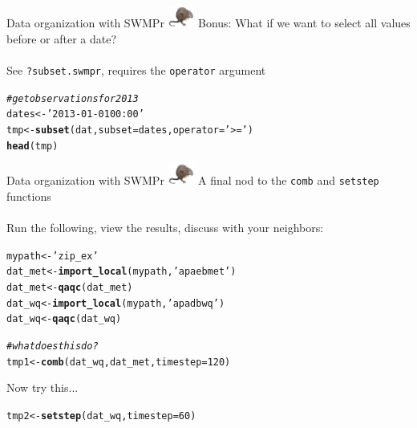 \documentclass[xcolor=dvipsnames]{beamer}\usepackage[]{graphicx}\usepackage[]{color}
\makeatletter
\newcommand{\hlnum}[1]{\textcolor[rgb]{0.686,0.059,0.569}{#1}}%
\newcommand{\hlstr}[1]{\textcolor[rgb]{0.192,0.494,0.8}{#1}}%
\newcommand{\hlcom}[1]{\textcolor[rgb]{0.678,0.584,0.686}{\textit{#1}}}%
\newcommand{\hlstd}[1]{\textcolor[rgb]{0.345,0.345,0.345}{#1}}%
\newcommand{\hlkwb}[1]{\textcolor[rgb]{0.69,0.353,0.396}{#1}}%
\newcommand{\hlkwc}[1]{\textcolor[rgb]{0.333,0.667,0.333}{#1}}%
\newcommand{\hlkwd}[1]{\textcolor[rgb]{0.737,0.353,0.396}{\textbf{#1}}}%
\newenvironment{kframe}{%
 \def\at@end@of@kframe{}%
 \ifinner\ifhmode%
  \def\at@end@of@kframe{\end{minipage}}%
  \begin{minipage}{\columnwidth}%
 \fi\fi%
 \def\FrameCommand##1{\hskip\@totalleftmargin \hskip-\fboxsep
 \colorbox{shadecolor}{##1}\hskip-\fboxsep
     \hskip-\linewidth \hskip-\@totalleftmargin \hskip\columnwidth}%
 \MakeFramed {\advance\hsize-\width
   \@totalleftmargin\z@ \linewidth\hsize
   \@setminipage}}%
 {\par\unskip\endMakeFramed%
 \at@end@of@kframe}
\newenvironment{knitrout}{}{} %
\makeatother
\begin{document}
\begin{frame}[fragile]{Data organization with SWMPr \includegraphics[width = 0.065\textwidth]{imgs/swmprat.png}}
\onslide<+->
Bonus: What if we want to select all values before or after a date?  \\~\\
See \texttt{?subset.swmpr}, requires the \texttt{operator} argument
\onslide<+->
\begin{knitrout}\scriptsize
{}\color{fgcolor}\begin{kframe}
\begin{alltt}
\hlcom{# get observations for 2013}
\hlstd{dates} \hlkwb{<-} \hlstr{'2013-01-01 00:00'}
\hlstd{tmp} \hlkwb{<-} \hlkwd{subset}\hlstd{(dat,} \hlkwc{subset} \hlstd{= dates,} \hlkwc{operator} \hlstd{=} \hlstr{'>='}\hlstd{)}
\hlkwd{head}\hlstd{(tmp)}
\end{alltt}
\end{kframe}
\end{knitrout}
\end{frame}

\begin{frame}[fragile]{Data organization with SWMPr \includegraphics[width = 0.065\textwidth]{imgs/swmprat.png}}
\onslide<+->
A final nod to the \texttt{comb} and \texttt{setstep} functions \\~\\
Run the following, view the results, discuss with your neighbors:
\begin{knitrout}\scriptsize
{}\color{fgcolor}\begin{kframe}
\begin{alltt}
\hlstd{mypath} \hlkwb{<-} \hlstr{'zip_ex'}
\hlstd{dat_met} \hlkwb{<-} \hlkwd{import_local}\hlstd{(mypath,} \hlstr{'apaebmet'}\hlstd{)}
\hlstd{dat_met} \hlkwb{<-} \hlkwd{qaqc}\hlstd{(dat_met)}
\hlstd{dat_wq} \hlkwb{<-} \hlkwd{import_local}\hlstd{(mypath,} \hlstr{'apadbwq'}\hlstd{)}
\hlstd{dat_wq} \hlkwb{<-} \hlkwd{qaqc}\hlstd{(dat_wq)}

\hlcom{# what does this do?}
\hlstd{tmp1} \hlkwb{<-} \hlkwd{comb}\hlstd{(dat_wq, dat_met,} \hlkwc{timestep} \hlstd{=} \hlnum{120}\hlstd{)}
\end{alltt}
\end{kframe}
\end{knitrout}
\onslide<+->
Now try this...
\begin{knitrout}\scriptsize
{}\color{fgcolor}\begin{kframe}
\begin{alltt}
\hlstd{tmp2} \hlkwb{<-} \hlkwd{setstep}\hlstd{(dat_wq,} \hlkwc{timestep} \hlstd{=} \hlnum{60}\hlstd{)}
\end{alltt}
\end{kframe}
\end{knitrout}
\end{frame}
\end{document}
